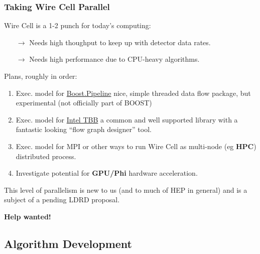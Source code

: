 \documentclass[xcolor=dvipsnames]{beamer}
\begin{document}
\begin{frame}
  \frametitle{Taking Wire Cell Parallel}
  Wire Cell is a 1-2 punch for today's computing:
  \begin{itemize}\footnotesize
  \item[$\rightarrow$] Needs high thoughput to keep up with detector data rates.
  \item[$\rightarrow$] Needs high performance due to CPU-heavy algorithms.
  \end{itemize}
  Plans, roughly in order:
  \begin{enumerate}\footnotesize
  \item Exec. model for \href{https://github.com/erenon/pipeline}{Boost.Pipeline} nice, simple threaded data flow package, but experimental (not officially part of BOOST)
  \item Exec. model for \href{https://www.threadingbuildingblocks.org/}{Intel TBB} a common and well supported library with a fantastic looking ``flow graph designer'' tool.
  \item Exec. model for MPI or other ways to run Wire Cell as multi-node (eg \textbf{HPC}) distributed process.
  \item Investigate potential for \textbf{GPU/Phi} hardware acceleration.
  \end{enumerate}

  This level of parallelism is new to us (and to much of HEP in general) and is a subject of a pending LDRD proposal.

  \textbf{Help wanted!}
\end{frame}

\subsection{Algorithm Development}

\begin{frame}
  \frametitle{}
  
  
  
  
\end{frame}

\section{}
\end{document}
